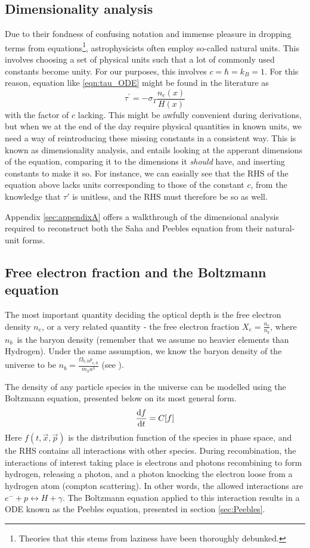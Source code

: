 \documentclass[10pt, a4paper]{article}
\begin{document}
\subsection{Dimensionality analysis}
Due to their fondness of confusing notation and immense pleasure in dropping terms from equations\footnote{Theories that this stems from laziness have been thoroughly debunked.}, astrophysicists often employ so-called natural units. This involves choosing a set of physical units such that a lot of commonly used constants become unity. For our purposes, this involves $c = \hbar = k_B = 1$. For this reason, equation like \ref{eqn:tau_ODE} might be found in the literature as
\begin{equation*}
    \tau^\prime = - \sigma_T\frac{n_{e}(x)}{H(x)}
\end{equation*}
with the factor of $c$ lacking. This might be awfully convenient during derivations, but when we at the end of the day require physical quantities in known units, we need a way of reintroducing these missing constants in a consistent way. This is known as dimensionality analysis, and entails looking at the apperant dimensions of the equation, comparing it to the dimensions it \textit{should} have, and inserting constants to make it so. For instance, we can easially see that the RHS of the equation above lacks units corresponding to those of the constant $c$, from the knowledge that $\tau'$ is unitless, and the RHS must therefore be so as well.

Appendix \ref{sec:appendixA} offers a walkthrough of the dimensional analysis required to reconstruct both the Saha and Peebles equation from their natural-unit forms.


\subsection{Free electron fraction and the Boltzmann equation}
The most important quantity deciding the optical depth is the free electron density $n_e$, or a very related quantity - the free electron fraction $X_e = \frac{n_e}{n_b}$, where $n_b$ is the baryon density (remember that we assume no heavier elements than Hydrogen). Under the same assumption, we know the baryon density of the universe to be $n_b = \frac{\Omega_{b,0}\rho_{c,0}}{m_ha^3}$ (see \cite{Milestone1}).

The density of any particle species in the universe can be modelled using the Boltzmann equation, presented below on its most general form.
\begin{equation*}
    \dv{f}{t} = C[f]
\end{equation*}
Here $f(t, \vec{x}, \vec{p})$ is the distribution function of the species in phase space, and the RHS contains all interactions with other species. During recombination, the interactions of interest taking place is electrons and photons recombining to form hydrogen, releasing a photon, and a photon knocking the electron loose from a hydrogen atom (compton scattering). In other words, the allowed interactions are $e^- + p \leftrightarrow H + \gamma$. The Boltzmann equation applied to this interaction results in a ODE known as the Peebles equation, presented in section \ref{sec:Peebles}. 
\end{document}

